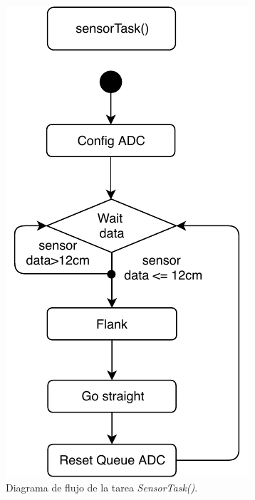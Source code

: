 \documentclass[conference]{IEEEtran}
\begin{document}
\begin{figure}[h]
    \centering
    \includegraphics[width=0.7\linewidth]{photos/sensorTask.pdf}
    \caption{\large{Diagrama de flujo de la tarea \textit{SensorTask()}.}}
    \label{fig:sensor}
\end{figure}
\end{document}
